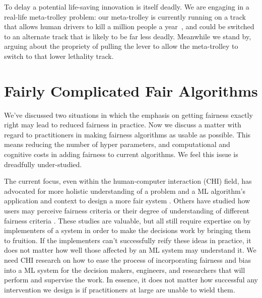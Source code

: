 \documentclass[11pt]{article}
\begin{document}
To delay a potential life-saving innovation is itself deadly. We are engaging in a real-life meta-trolley problem:
our meta-trolley is currently running on a track that allows human drivers to kill a million people a year~\cite{who2015road}, and could be switched to an alternate track that is likely to be far less deadly. Meanwhile we stand by, arguing about the propriety of pulling the lever to allow the meta-trolley to switch to that lower lethality track.


\section{Fairly Complicated Fair Algorithms} \label{sec:complicated}

We've discussed two situations in which the emphasis on getting fairness exactly right may lead to reduced fairness in practice. Now we discuss a matter with regard to practitioners in making fairness algorithms as usable as possible. This means reducing the number of hyper parameters, and computational and cognitive costs in adding fairness to current algorithms. We feel this issue is dreadfully under-studied. 

The current focus, even within the human-computer interaction (CHI) field, has advocated for more holistic understanding of a problem and a ML algorithm's application and context to design a more fair system \cite{10.1145/3334480.3375158}. Others have studied how users may perceive fairness criteria or their degree of understanding of different fairness criteria \cite{pmlr-v119-saha20c,Srivastava:2019:MNV:3292500.3330664}. These studies are valuable, but all still require expertise on by implementers of a system in order to make the decisions work by bringing them to fruition. If the implementers can't successfully reify these ideas in practice, it does not matter how well those affected by an ML system may understand it. We need CHI research on how to ease the process of incorporating fairness and bias into a ML system for the decision makers, engineers, and researchers that will perform and supervise the work. In essence, it does not matter how successful any intervention we design is if practitioners at large are unable to wield them. 
\end{document}
